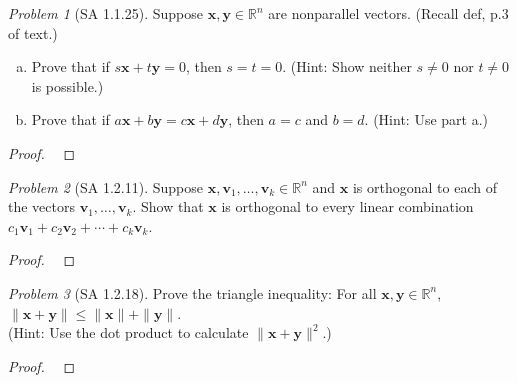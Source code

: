 \documentclass[fleqn,11pt]{paper}
\theoremstyle{remark}
\newtheorem{problem}{Problem}
\newcommand\R{\fld{R}}
\renewcommand{\vec}[1]{\mathbf{#1}}
\newcommand{\<}{\ensuremath{\langle}}
\renewcommand{\>}{\ensuremath{\rangle}}
\newcommand\fld[1]{\ensuremath{\mathbb{#1}}}
\newcommand\vv{\vec{v}}
\newcommand\vx{\vec{x}}
\newcommand\vy{\vec{y}}
\begin{document}
\newpage

\begin{problem}[SA 1.1.25]
Suppose $\vx, \vy \in \R^n$ are nonparallel vectors. (Recall def, p.3 of text.)
\begin{enumerate}[a.]
\item 
Prove that if $s\vx + t\vy = 0$, then $s = t = 0$. 
(Hint: Show neither $s \neq 0$ nor $t \neq0$ is possible.)
\item Prove that if $a\vx + b\vy = c\vx + d\vy$, then $a = c$ and $b = d$.
(Hint: Use part a.)
\end{enumerate}
\end{problem}
\begin{proof}
~\vfill
\end{proof}


\newpage

\begin{problem}[SA 1.2.11]
Suppose $\vx, \vv_1, \dots, \vv_k \in \R^n$ and $\vx$ is orthogonal to each of
the vectors $\vv_1,\dots, \vv_k$. Show that $\vx$ is orthogonal to every linear
combination $c_1 \vv_1 + c_2 \vv_2 + \cdots + c_k \vv_k$.
\end{problem}
\begin{proof}
~\vfill
\end{proof}

\newpage

\begin{problem}[SA 1.2.18]
Prove the triangle inequality: For all 
$\vx, \vy \in \R^n$, $\|\vx + \vy\| \leq \|\vx\| + \|\vy\|$. \\
(Hint: Use the dot product to calculate $\|\vx + \vy\|^2$.)
\end{problem}
\begin{proof}
~\vfill
\end{proof}

\newpage
\end{document}
